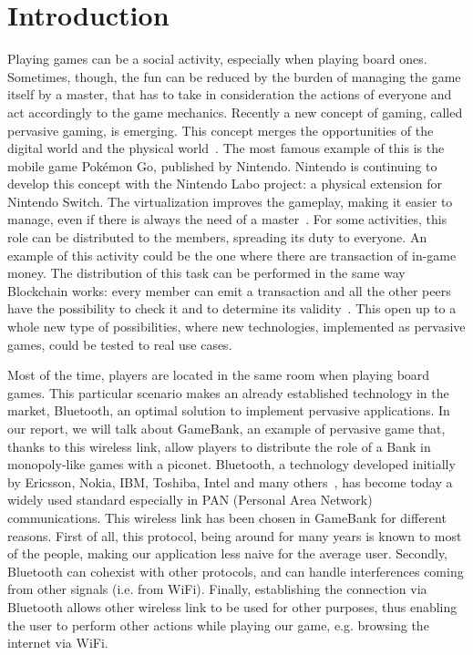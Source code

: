 \section{Introduction}
\label{introduction}

Playing games can be a social activity, especially when playing board ones. 
Sometimes, though, the fun can be reduced by the burden of managing the 
game itself by a master, that has to take in consideration the actions of 
everyone and act accordingly to the game mechanics. Recently a new concept of 
gaming, called pervasive gaming, is emerging. This concept merges the 
opportunities of the digital world and the physical world~\cite{arango17}. The 
most famous example of this is the mobile game Pokémon Go, published by 
Nintendo. Nintendo is continuing to develop this concept with the Nintendo Labo 
project: a physical extension for Nintendo Switch.
The virtualization improves the gameplay, making it easier to manage, even if 
there is always the need of a master~\cite{bjork01}.
For some activities, this role can be distributed to the members, spreading its 
duty to everyone. An example of this activity could be the one where there are 
transaction of in-game money. The distribution of this task can be performed in 
the same way Blockchain works: every member can emit a transaction and all the 
other peers have the possibility to check it and to determine its 
validity~\cite{nakamoto08}. This open up to a whole new type of possibilities, 
where new technologies, implemented as pervasive games, could be tested to real 
use cases.

Most of the time, players are located in the same room when playing board 
games. This particular scenario makes an already established technology in 
the market, Bluetooth, an optimal solution to implement pervasive applications. 
In our report, we will talk about GameBank, an example of pervasive game that, 
thanks to this wireless link, allow players to distribute the role of a Bank in 
monopoly-like games with a piconet.
Bluetooth, a technology developed initially by Ericsson, Nokia, IBM, Toshiba, 
Intel and many others~\cite{haartsen00}, has become today a widely used
standard especially in PAN (Personal Area Network) communications. This
wireless link has been chosen in GameBank for different reasons. First of all,
this protocol, being around for many years is known to most of the people,
making our application less naive for the average user. Secondly, Bluetooth can
cohexist with other protocols, and can handle interferences coming from other
signals (i.e. from WiFi). Finally, establishing the connection via Bluetooth
allows other wireless link to be used for other purposes, thus enabling the
user to perform other actions while playing our game, e.g. browsing the
internet via WiFi.\\

